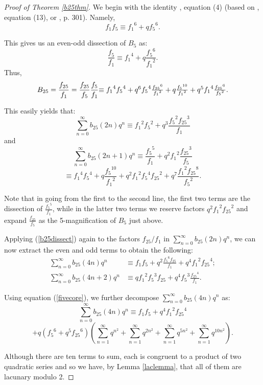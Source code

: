 \documentclass[12pt]{amsart}
\theoremstyle{definition}
\begin{document}
\begin{proof}[Proof of Theorem \ref{b25thm}]   We begin with the identity \cite{JKZ}, equation (4) (based on \cite{Hirsch}, equation (13), or \cite{BBG}, p. 301). Namely, $$f_1 f_5 \equiv {f_1}^6 + q {f_5}^6.$$

This gives us an even-odd dissection of $B_5$ as: $$\frac{f_5}{f_1} \equiv {f_1}^4 + q \frac{{f_5}^6}{{f_1}^2}.$$
Thus, \begin{equation}\label{b25dissect}B_{25} = \frac{f_{25}}{f_1} = \frac{f_{25}}{f_5} \frac{f_5}{f_1} $$$$\equiv {f_1}^4 {f_5}^4 + q^6 {f_5}^4 \frac{{f_{25}}^6}{{f_1}^2} + q \frac{{f_5}^{10}}{{f_1}^2} + q^5 {f_1}^4 \frac{{f_{25}}^6}{{f_5}^2} .\end{equation}

This easily yields that:
$$\sum_{n=0}^\infty b_{25} (2n) q^n \equiv {f_1}^2 {f_5}^2 + q^3 \frac{{f_5}^2 {f_{25}}^3}{f_1}$$
and
$$\sum_{n=0}^\infty b_{25} (2n+1) q^n \equiv \frac{{f_5}^{5}}{{f_1}} + q^2 {f_1}^2 \frac{{f_{25}}^3}{{f_5}}$$
$$\equiv {f_1}^4 {f_5}^4 + q \frac{{f_5}^{10}}{{f_1}^2} + q^2 {f_1}^2 {f_5}^4 {f_{25}}^2 + q^7 \frac{{f_1}^2 {f_{25}}^8}{{f_5}^2}.$$

Note that in going from the first to the second line, the first two terms are the dissection of $\frac{{f_5}^5}{f_1}$, while in the latter two terms we reserve factors $q^2 {f_1}^2 {f_{25}}^2$ and expand $\frac{f_{25}}{f_5}$ as the 5-magnification of $B_5$ just above.

Applying (\ref{b25dissect}) again to the factors $f_{25} / f_1$ in $\sum_{n=0}^\infty b_{25}(2n) q^n$, we can now extract the even and odd terms to obtain the following: 
\begin{align}\label{254}
\sum_{n=0}^\infty b_{25}(4n) q^n &\equiv f_1 f_5 + q^2 \frac{{f_5}^6 f_{25}}{f_1} + q^4 {f_1}^2 {f_{25}}^4; \\
\sum_{n=0}^\infty b_{25} (4n+2) q^n &\equiv q {f_1}^2 {f_5}^3 f_{25} + q^4 {f_5}^3 \frac{{f_{25}}^4}{f_1}.
\end{align}

Using equation (\ref{fivecore}), we further decompose $\sum_{n=0}^\infty b_{25}(4n) q^n$ as: 
$$\sum_{n=0}^\infty b_{25}(4n) q^n \equiv f_1 f_5 + q^4 {f_1}^2 {f_{25}}^4 $$$$+ q \left({f_5}^6 + q^5 {f_{25}}^6 \right) \left( \sum_{n=1}^\infty q^{n^2} + \sum_{n=1}^\infty q^{2n^2} + \sum_{n=1}^\infty q^{5n^2} + \sum_{n=1}^\infty q^{10n^2} \right).$$

Although there are ten terms to sum, each is congruent to a product of two quadratic series and so we have, by Lemma \ref{laclemma}, that all of them are lacunary modulo 2.  


\end{proof}
\end{document}
